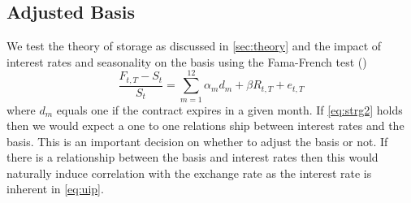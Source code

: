 \subsection{Adjusted Basis}
We test the theory of storage as discussed in \autoref{sec:theory} and the impact of interest rates and seasonality on the basis using the Fama-French test (\cite{famafrench})
\begin{equation}
\label{eq:ff}
 \frac{F_{t,T} - S_t}{S_t} = \sum_{m=1}^{12} \alpha_m d_m + \beta R_{t,T} + e_{t, T}
\end{equation}
where $d_m$ equals one if the contract expires in a given month. If \autoref{eq:strg2} holds then we would expect a one to one relations ship between interest rates and the basis. This is an important decision on whether to adjust the basis or not. If there is a relationship between the basis and interest rates then this would naturally induce correlation with the exchange rate as the interest rate is inherent in \autoref{eq:uip}. 

